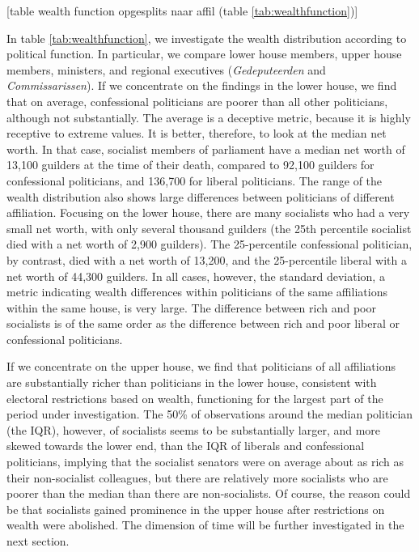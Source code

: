 \begin{center}
    
    [table wealth function opgesplits naar affil (table \ref{tab:wealthfunction})]
\end{center}

    In table \ref{tab:wealthfunction}, we investigate the wealth distribution according to political function. In particular, we compare lower house members, upper house members, ministers, and regional executives (\textit{Gedeputeerden} and \textit{Commissarissen}). If we concentrate on the findings in the lower house, we find that on average, confessional politicians are poorer than all other politicians, although not substantially. The average is a deceptive metric, because it is highly receptive to extreme values. It is better, therefore, to look at the median net worth. In that case, socialist members of parliament have a median net worth of 13,100 guilders at the time of their death, compared to 92,100 guilders for confessional politicians, and 136,700 for liberal politicians. The range of the wealth distribution also shows large differences between politicians of different affiliation. Focusing on the lower house, there are many socialists who had a very small net worth, with only several thousand guilders (the 25th percentile socialist died with a net worth of 2,900 guilders). The 25-percentile confessional politician, by contrast, died with a net worth of 13,200, and the  25-percentile liberal with a net worth of 44,300 guilders.  In all cases, however, the standard deviation, a metric indicating wealth differences within politicians of the same affiliations within the same house, is very large. The difference between rich and poor socialists is of the same order as the difference between rich and poor liberal or confessional politicians. 
    
    If we concentrate on the upper house, we find that politicians of all affiliations are substantially richer than politicians in the lower house, consistent with electoral restrictions based on wealth, functioning for the largest part of the period under investigation. \autocite{moes1994lijsten} The 50\% of observations around the median politician (the IQR), however, of socialists seems to be substantially larger, and more skewed towards the lower end, than the IQR of liberals and confessional politicians, implying that the socialist senators were on average about as rich as their non-socialist colleagues, but there are relatively more socialists who are poorer than the median than there are non-socialists. Of course, the reason could be that socialists gained prominence in the upper house after restrictions on wealth were abolished. The dimension of time will be further investigated in the next section. 
    
